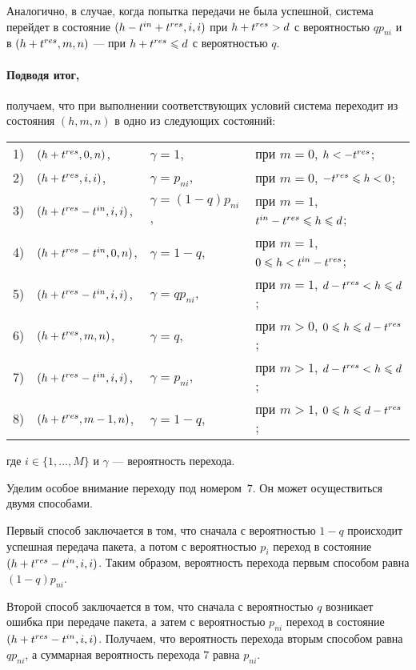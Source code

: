 Аналогично, в случае, когда попытка передачи не была успешной, система перейдет в состояние $(h - t^{in} + t^{res}, i, i)$ при  $h + t^{res} > d$ с вероятностью $q p_{ni}$ и в $(h + t^{res}, m, n)$ --- при $h + t^{res} \leqslant d$ с вероятностью $q$.

\paragraph{Подводя итог,} получаем, что при выполнении соответствующих условий система  переходит из состояния $(h, m, n)$ в одно из следующих состояний:

\begin{tabular}{l l l l}
1)	&$(h + t^{res}, 0, n)$, 			&$\gamma = 1$, 	&при $m = 0$, $h < -t^{res}$; \\
2)  &$(h + t^{res}, i, i)$, 			&$\gamma = p_{ni}$, &при $m = 0$, $-t^{res} \leqslant h < 0$; \\
3)  &$(h + t^{res} - t^{in}, i, i)$, 	&$\gamma = (1 - q)p_{ni}$, &при $m = 1$, $t^{in} - t^{res} \leqslant h \leqslant d$; \\
4)  &$(h + t^{res} - t^{in}, 0, n)$, 	&$\gamma = 1 - q$, &при $m = 1$, $0 \leqslant h < t^{in} - t^{res}$; \\
5)  &$(h + t^{res} - t^{in}, i, i)$, 	&$\gamma = q p_{ni}$, &при $m = 1$, $d - t^{res} < h \leqslant d$; \\
6)  &$(h + t^{res}, m, n)$, 			&$\gamma = q$, &при $m > 0$, $0 \leqslant h \leqslant d - t^{res}$; \\
7)  &$(h + t^{res} - t^{in}, i, i)$,	&$\gamma = p_{ni}$, &при $m > 1$, $d - t^{res} < h \leqslant d$; \\
8)  &$(h + t^{res}, m - 1, n)$, &$\gamma = 1 - q$, &при $m > 1$, $0 \leqslant h \leqslant d - t^{res}$;
\end{tabular} \newline
где $i\in\{1,\ldots,M\}$ и $\gamma$ --- вероятность перехода. 

Уделим особое внимание переходу под номером~$7$. Он может осуществиться двумя способами. 

Первый способ заключается в том, что сначала с вероятностью $1 - q$ происходит успешная передача пакета, а потом с вероятностью $p_i$ переход в состояние $(h + t^{res} - t^{in}, i, i)$. Таким образом, вероятность перехода первым способом равна $(1 - q) p_{ni}$.

Второй способ заключается в том, что сначала с вероятностью $q$ возникает ошибка при передаче пакета, а затем с вероятностью $p_{ni}$ переход в состояние $(h + t^{res} - t^{in}, i, i)$. Получаем, что  вероятность перехода вторым способом равна $q p_{ni}$, а суммарная вероятность перехода $7$ равна $p_{ni}$. 

